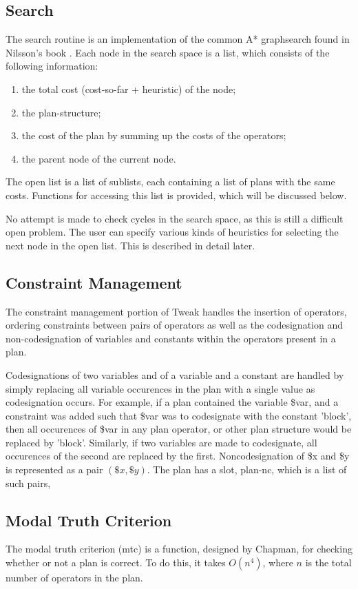\subsection{Search}
The search routine is an implementation of the common A* graphsearch
found in Nilsson's book \cite{nilsson}.  Each node in the search space
is a list, which consists of the following information:
\begin{enumerate}
\item the total cost (cost-so-far + heuristic) of the node;
\item the plan-structure;
\item the cost of the plan by summing up the costs of the operators;
\item the parent node of the current node.
\end{enumerate}

The open list is a list of sublists, each containing a list of plans
with the same costs.  Functions for accessing this list is provided,
which will be discussed below.

No attempt is made to check cycles in the search space, as this is
still a difficult open problem.  The user can specify various kinds of
heuristics for selecting the next node in the open list.  This is
described in detail later.

\subsection{Constraint Management}
The constraint management portion of Tweak handles the insertion of
operators, ordering constraints between pairs of operators as well as
the codesignation and non-codesignation of variables and constants
within the operators present in a plan.

Codesignations of two variables and of a variable and a constant 
are handled by simply replacing all variable occurences
in the plan with a single value as codesignation occurs.  For example,
if a plan contained the variable \$var, and a constraint was added
such that \$var was to codesignate with the constant 'block', then all
occurences of
\$var in any plan operator, or other plan structure would be replaced by
'block'.  Similarly, if two variables are made to codesignate, all
occurences of the second are replaced by the first.  Noncodesignation
of \$x and \$y is represented as a pair $(\$x, \$y)$.  The plan has a
slot, plan-nc, which is a list of such pairs,

\subsection{Modal Truth Criterion}
The modal truth criterion (mtc) is a function, designed by Chapman, for
checking whether or not a plan  is correct.  To do this, it takes
$O(n^4)$, where $n$ is the total number of operators in the plan.

